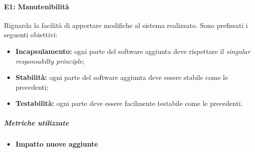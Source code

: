 \paragraph{\textbf{E1: Manutenibilità}}
Riguarda la facilità di apportare modifiche al sistema realizzato. Sono prefissati i seguenti obiettivi:
\begin{itemize}
	\item \textbf{Incapsulamento:} ogni parte del software aggiunta deve rispettare il \textit{singular responsabilty principle\pedice};
	\item \textbf{Stabilità:} ogni parte del software aggiunta deve essere stabile come le precedenti;
	\item \textbf{Testabilità:} ogni parte deve essere facilmente testabile come le precedenti.
\end{itemize}
\vspace{0.8cm}
\subparagraph{Metriche utilizzate}
\begin{itemize}
	\item \textbf{Impatto nuove aggiunte}
\end{itemize}
\begin{table}[!htpb]
	\centering
	\renewcommand{\arraystretch}{2} 
	\caption{Metriche utilizzate Manutenibilità}
\end{table}

